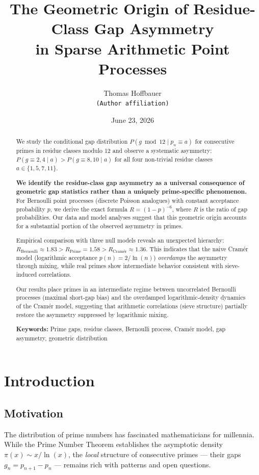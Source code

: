 \documentclass[11pt,a4paper]{article}
\title{\textbf{The Geometric Origin of Residue-Class Gap Asymmetry\\in Sparse Arithmetic Point Processes}}
\author{Thomas Hoffbauer\\
\small \texttt{(Author affiliation)}}
\date{June 23, 2026}
\theoremstyle{definition}
\theoremstyle{remark}
\begin{document}
\maketitle

\begin{abstract}
We study the conditional gap distribution $P(g \bmod 12 \mid p_n \equiv a)$ for consecutive primes in residue classes modulo 12 and observe a systematic asymmetry: $P(g \equiv 2,4 \mid a) > P(g \equiv 8,10 \mid a)$ for all four non-trivial residue classes $a \in \{1, 5, 7, 11\}$.

\textbf{We identify the residue-class gap asymmetry as a universal consequence of geometric gap statistics rather than a uniquely prime-specific phenomenon.} For Bernoulli point processes (discrete Poisson analogues) with constant acceptance probability $p$, we derive the exact formula $R = (1-p)^{-6}$, where $R$ is the ratio of gap probabilities. Our data and model analyses suggest that this geometric origin accounts for a substantial portion of the observed asymmetry in primes.

Empirical comparison with three null models reveals an unexpected hierarchy: $R_{\text{Bernoulli}} \approx 1.83 > R_{\text{Prime}} = 1.58 > R_{\text{Cramér}} \approx 1.36$. This indicates that the naive Cramér model (logarithmic acceptance $p(n) = 2/\ln(n)$) \emph{overdamps} the asymmetry through mixing, while real primes show intermediate behavior consistent with sieve-induced correlations.

Our results place primes in an intermediate regime between uncorrelated Bernoulli processes (maximal short-gap bias) and the overdamped logarithmic-density dynamics of the Cramér model, suggesting that arithmetic correlations (sieve structure) partially restore the asymmetry suppressed by logarithmic mixing.

\textbf{Keywords:} Prime gaps, residue classes, Bernoulli process, Cramér model, gap asymmetry, geometric distribution
\end{abstract}

\section{Introduction}

\subsection{Motivation}

The distribution of prime numbers has fascinated mathematicians for millennia. While the Prime Number Theorem establishes the asymptotic density $\pi(x) \sim x/\ln(x)$, the \emph{local} structure of consecutive primes — their gaps $g_n = p_{n+1} - p_n$ — remains rich with patterns and open questions.
\end{document}

